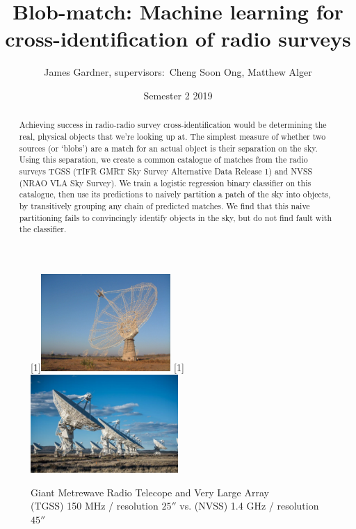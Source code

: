 \documentclass[12pt,a4paper]{article}
\title{Blob-match: Machine learning for cross-identification of radio surveys}
\author{James Gardner, supervisors:\ Cheng Soon Ong, Matthew Alger}
\date{Semester 2 2019}
\begin{document}
\maketitle

\begin{abstract}
    Achieving success in radio-radio survey cross-identification would be determining the real, physical objects that we're looking up at. The simplest measure of whether two sources (or `blobs') are a match for an actual object is their separation on the sky. Using this separation, we create a common catalogue of matches from the radio surveys TGSS (TIFR GMRT Sky Survey Alternative Data Release 1) and NVSS (NRAO VLA Sky Survey). We train a logistic regression binary classifier on this catalogue, then use its predictions to naively partition a patch of the sky into objects, by transitively grouping any chain of predicted matches. We find that this naive partitioning fails to convincingly identify objects in the sky, but do not find fault with the classifier.
\end{abstract}

\begin{figure}
    \centering
    \scalebox{-1}[1]{\includegraphics[width=0.44\textwidth]{pics/GMRT.pdf}} \;\;
    \scalebox{-1}[1]{\includegraphics[width=0.5\textwidth]{pics/VLA.pdf}}
    \caption{Giant Metrewave Radio Telecope and Very Large Array\\
    (TGSS) 150 MHz / resolution $\ang{;;25}$ vs. (NVSS) 1.4 GHz / resolution $\ang{;;45}$}
\end{figure}
\end{document}
